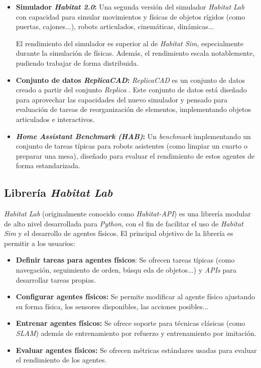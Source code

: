 \begin{itemize}
	\item \textbf{Simulador \textit{Habitat 2.0}:} Una segunda versión del simulador \textit{Habitat Lab} con capacidad para simular movimientos y físicas de objetos rígidos (como puertas, cajones...), robots articulados, cinemáticas, dinámicas...
	
El rendimiento del simulador es superior al de \textit{Habitat Sim}, especialmente durante la simulación de físicas. Además, el rendimiento escala notablemente, pudiendo trabajar de forma distribuida. 
	
	\item \textbf{Conjunto de datos \textit{ReplicaCAD}:} \textit{ReplicaCAD} es un conjunto de datos creado a partir del conjunto \textit{Replica} \cite{DBLP:journals/corr/abs-1906-05797}. Este conjunto de datos está diseñado para aprovechar las capacidades del nuevo simulador y pensado para evaluación de tareas de reorganización de elementos, implementando objetos articulados e interactivos.
	
	\item \textbf{\textit{Home Assistant Benchmark (HAB)}:} Un \textit{benchmark} implementando un conjunto de tareas típicas para robots asistentes (como limpiar un cuarto o preparar una mesa), diseñado para evaluar el rendimiento de estos agentes de forma estandarizada.
\end{itemize}

\subsection{Librería \textit{Habitat Lab}}

\textit{Habitat Lab} (originalmente conocido como \textit{Habitat-API}) \cite{habitat19iccv} es una librería modular de alto nivel desarrollada para \textit{Python}, con el fin de facilitar el uso de \textit{Habitat Sim} y el desarrollo de agentes físicos. El principal objetivo de la librería es permitir a los usuarios:

\begin{itemize}
	\item \textbf{Definir tareas para agentes físicos}: Se ofrecen tareas típicas (como navegación, seguimiento de orden, búsqu eda de objetos...) y \textit{APIs} para desarrollar tareas propias.
	\item \textbf{Configurar agentes físicos:} Se permite modificar al agente físico ajustando su forma  física, los sensores disponibles, las acciones posibles...
	\item \textbf{Entrenar agentes físicos:} Se ofrece soporte para técnicas clásicas (como \textit{SLAM}) además de entrenamiento por refuerzo y entrenamiento por imitación.
	\item \textbf{Evaluar agentes físicos:} Se ofrecen métricas estándares \cite{DBLP:journals/corr/abs-1807-06757} usadas para evaluar el rendimiento de los agentes.
\end{itemize}

